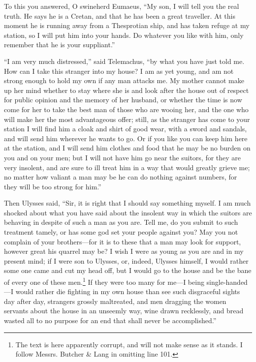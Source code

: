 To this you answered, O swineherd Eumaeus, “My son, I will tell you the real
truth. He says he is a Cretan, and that he has been a great traveller. At this
moment he is running away from a Thesprotian ship, and has taken refuge at my
station, so I will put him into your hands. Do whatever you like with him, only
remember that he is your suppliant.”

“I am very much distressed,” said Telemachus, “by what you have just told me.
How can I take this stranger into my house? I am as yet young, and am not
strong enough to hold my own if any man attacks me. My mother cannot make up
her mind whether to stay where she is and look after the house out of respect
for public opinion and the memory of her husband, or whether the time is now
come for her to take the best man of those who are wooing her, and the one who
will make her the most advantageous offer; still, as the stranger has come to
your station I will find him a cloak and shirt of good wear, with a sword and
sandals, and will send him wherever he wants to go. Or if you like you can keep
him here at the station, and I will send him clothes and food that he may be no
burden on you and on your men; but I will not have him go near the suitors, for
they are very insolent, and are sure to ill treat him in a way that would
greatly grieve me; no matter how valiant a man may be he can do nothing against
numbers, for they will be too strong for him.”

Then Ulysses said, “Sir, it is right that I should say something myself. I am
much shocked about what you have said about the insolent way in which the
suitors are behaving in despite of such a man as you are. Tell me, do you
submit to such treatment tamely, or has some god set your people against you?
May you not complain of your brothers—for it is to these that a man may look
for support, however great his quarrel may be? I wish I were as young as you
are and in my present mind; if I were son to Ulysses, or, indeed, Ulysses
himself, I would rather some one came and cut my head off, but I would go to
the house and be the bane of every one of these men.\footnote{The text is here apparently corrupt, and will not make sense as it stands. I
follow Messrs. Butcher \& Lang in omitting line 101.} If they were too many for me—I
being single-handed—I would rather die fighting in my own house than see such
disgraceful sights day after day, strangers grossly maltreated, and men
dragging the women servants about the house in an unseemly way, wine drawn
recklessly, and bread wasted all to no purpose for an end that shall never be
accomplished.”

